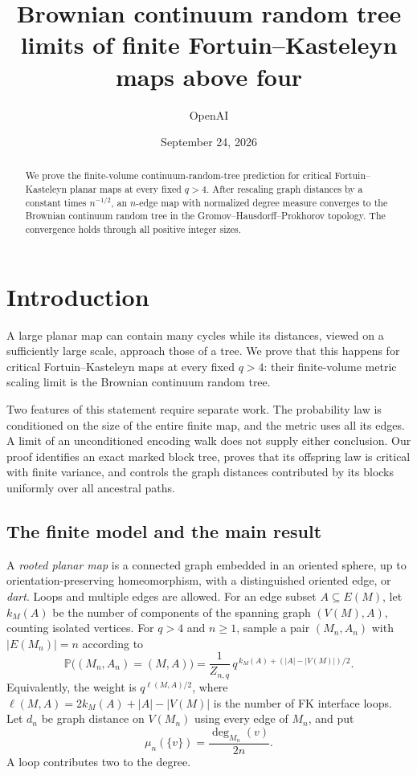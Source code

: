 \documentclass[11pt,a4paper]{article}
\title{Brownian continuum random tree limits of finite Fortuin--Kasteleyn maps above four}
\author{OpenAI}
\date{September 24, 2026}
\numberwithin{equation}{section}
\theoremstyle{definition}
\theoremstyle{remark}
\renewcommand{\P}{\mathbb P}
\newcommand{\1}{\mathbf 1}
\begin{document}
\maketitle

\begin{abstract}
We prove the finite-volume continuum-random-tree prediction for critical
Fortuin--Kasteleyn planar maps at every fixed $q>4$. After rescaling graph
distances by a constant times $n^{-1/2}$, an $n$-edge map with normalized
degree measure converges to the Brownian continuum random tree in the
Gromov--Hausdorff--Prokhorov topology. The convergence holds through all
positive integer sizes.
\end{abstract}

\section{Introduction}\label{sec:introduction}

A large planar map can contain many cycles while its distances, viewed
on a sufficiently large scale, approach those of a tree. We prove that
this happens for critical Fortuin--Kasteleyn maps at every fixed
$q>4$: their finite-volume metric scaling limit is the Brownian
continuum random tree.

Two features of this statement require separate work. The probability
law is conditioned on the size of the entire finite map, and the metric
uses all its edges. A limit of an unconditioned encoding walk does not
supply either conclusion. Our proof identifies an exact marked block
tree, proves that its offspring law is critical with finite variance,
and controls the graph distances contributed by its blocks uniformly
over all ancestral paths.

\subsection{The finite model and the main result}

A \emph{rooted planar map} is a connected graph embedded in an oriented
sphere, up to orientation-preserving homeomorphism, with a distinguished
oriented edge, or \emph{dart}. Loops and multiple edges are allowed.
For an edge subset $A\subseteq E(M)$, let $k_M(A)$ be the number of
components of the spanning graph $(V(M),A)$, counting isolated vertices.
For $q>4$ and $n\ge1$, sample a pair $(M_n,A_n)$ with $|E(M_n)|=n$
according to
\begin{equation}\label{eq:finite-law}
 \P\big((M_n,A_n)=(M,A)\big)
  =\frac{1}{Z_{n,q}}\,
    q^{\,k_M(A)+(|A|-|V(M)|)/2}.
\end{equation}
Equivalently, the weight is $q^{\ell(M,A)/2}$, where
$\ell(M,A)=2k_M(A)+|A|-|V(M)|$ is the number of FK interface loops.
Let $d_n$ be graph distance on $V(M_n)$ using every edge of $M_n$, and put
\begin{equation}\label{eq:degree-measure}
 \mu_n(\{v\})=\frac{\deg_{M_n}(v)}{2n}.
\end{equation}
A loop contributes two to the degree.
\end{document}
